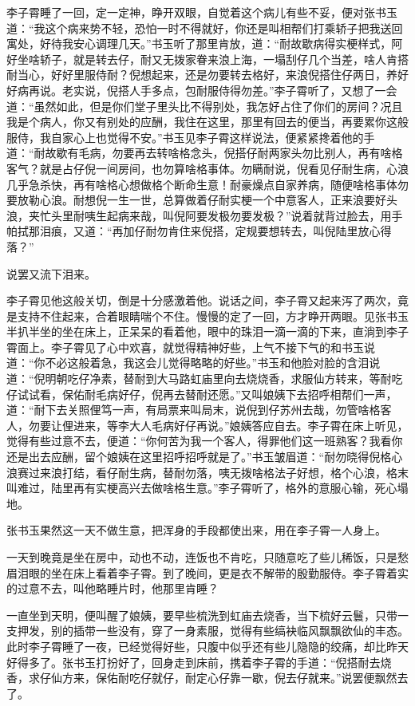 \documentclass[12pt,UTF8]{ctexbook}
\begin{document}
{{{李子霄睡了一回，定一定神，睁开双眼，自觉着这个病儿有些不妥，便对张书玉道：“我这个病来势不轻，恐怕一时不得就好，你还是叫相帮们打乘轿子把我送回寓处，好待我安心调理几天。”书玉听了那里肯放，道：“耐故歇病得实梗样式，阿好坐啥轿子，就是转去仔，耐又无拨家眷来浪上海，一塌刮仔几个当差，啥人肯搭耐当心，好好里服侍耐？倪想起来，还是勿要转去格好，来浪倪搭住仔两日，养好好病再说。老实说，倪搭人手多点，包耐服侍得勿差。”李子霄听了，又想了一会道：“虽然如此，但是你们堂子里头比不得别处，我怎好占住了你们的房间？况且我是个病人，你又有别处的应酬，我住在这里，那里有回去的便当，再要累你这般服侍，我自家心上也觉得不安。”书玉见李子霄这样说法，便紧紧搀着他的手道：“耐故歇有毛病，勿要再去转啥格念头，倪搭仔耐两家头勿比别人，再有啥格客气？就是占仔倪一间房间，也勿算啥格事体。勿瞒耐说，倪看见仔耐生病，心浪几乎急杀快，再有啥格心想做格个断命生意！耐豪燥点自家养病，随便啥格事体勿要放勒心浪。耐想倪一生一世，总算做着仔耐实梗一个中意客人，正来浪要好头浪，夹忙头里耐咦生起病来哉，叫倪阿要发极勿要发极？”说着就背过脸去，用手帕拭那泪痕，又道：“再加仔耐勿肯住来倪搭，定规要想转去，叫倪陆里放心得落？”

说罢又流下泪来。

李子霄见他这般关切，倒是十分感激着他。说话之间，李子霄又起来泻了两次，竟是支持不住起来，合着眼睛喘个不住。慢慢的定了一回，方才睁开两眼。见张书玉半扒半坐的坐在床上，正呆呆的看着他，眼中的珠泪一滴一滴的下来，直淌到李子霄面上。李子霄见了心中欢喜，就觉得精神好些，上气不接下气的和书玉说道：“你不必这般着急，我这会儿觉得略略的好些。”书玉和他脸对脸的含泪说道：“倪明朝吃仔净素，替耐到大马路虹庙里向去烧烧香，求服仙方转来，等耐吃仔试试看，保佑耐毛病好仔，倪再去替耐还愿。”又叫娘姨下去招呼相帮们一声，道：“耐下去关照俚笃一声，有局票来叫局末，说倪到仔苏州去哉，勿管啥格客人，勿要让俚进来，等李大人毛病好仔再说。”娘姨答应自去。李子霄在床上听见，觉得有些过意不去，便道：“你何苦为我一个客人，得罪他们这一班熟客？我看你还是出去应酬，留个娘姨在这里招呼招呼就是了。”书玉皱眉道：“耐勿晓得倪格心浪赛过来浪打结，看仔耐生病，替耐勿落，咦无拨啥格法子好想，格个心浪，格末叫难过，陆里再有实梗高兴去做啥格生意。”李子霄听了，格外的意服心输，死心塌地。

张书玉果然这一天不做生意，把浑身的手段都使出来，用在李子霄一人身上。

一天到晚竟是坐在房中，动也不动，连饭也不肯吃，只随意吃了些儿稀饭，只是愁眉泪眼的坐在床上看着李子霄。到了晚间，更是衣不解带的殷勤服侍。李子霄着实的过意不去，叫他略睡片时，他那里肯睡？

一直坐到天明，便叫醒了娘姨，要早些梳洗到虹庙去烧香，当下梳好云鬟，只带一支押发，别的插带一些没有，穿了一身素服，觉得有些缟袂临风飘飘欲仙的丰态。此时李子霄睡了一夜，已经觉得好些，只腹中似乎还有些儿隐隐的绞痛，却比昨天好得多了。张书玉打扮好了，回身走到床前，携着李子霄的手道：“倪搭耐去烧香，求仔仙方来，保佑耐吃仔就仔，耐定心仔靠一歇，倪去仔就来。”说罢便飘然去了。

}}}
\end{document}
